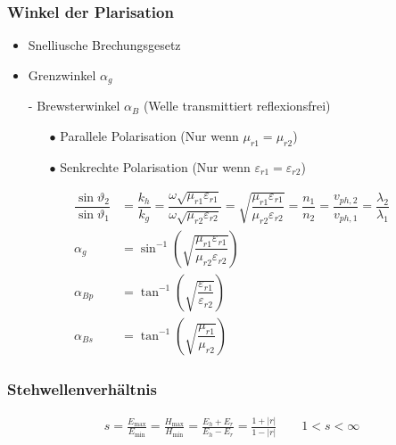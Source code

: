 \subsubsection{Winkel der Plarisation}
\begin{itemize}
    \item Snelliusche Brechungsgesetz
    \item Grenzwinkel $\alpha_g$
    \item[-] Brewsterwinkel $\alpha_B$ (Welle transmittiert reflexionsfrei)
    \begin{itemize}
        \item[$\bullet$] Parallele Polarisation (Nur wenn $\mu_{r1} = \mu_{r2}$)
        \item[$\bullet$] Senkrechte Polarisation (Nur wenn $\varepsilon_{r1} = \varepsilon_{r2}$)
    \end{itemize}
\end{itemize}

\begin{align*}
    \dfrac{\sin \vartheta_{2}}{\sin \vartheta_{1}} &= \dfrac{k_{h}}{k_{g}} = \dfrac{\omega \sqrt{\mu_{r 1} \varepsilon_{r 1}}}{\omega \sqrt{\mu_{r 2} \varepsilon_{r 2}}} = \sqrt{\dfrac{\mu_{r 1} \varepsilon_{r 1}}{\mu_{r 2} \varepsilon_{r 2}}} = \dfrac{n_{1}}{n_{2}} = \dfrac{v_{p h, 2}}{v_{p h, 1}} = \dfrac{\lambda_{2}}{\lambda_{1}}\\
    \alpha_g &= \sin^{-1} \left( \sqrt{ \dfrac{\mu_{r1} \varepsilon_{r1}}{\mu_{r2} \varepsilon_{r2}}} \right)\\
    \alpha_{Bp} &= \tan^{-1} \left( \sqrt{ \dfrac{\varepsilon_{r1}}{\varepsilon_{r2}}} \right)\\
    \alpha_{Bs} &= \tan^{-1} \left( \sqrt{ \dfrac{\mu_{r1}}{\mu_{r2}}} \right)
\end{align*}

\subsubsection{Stehwellenverhältnis}
\begin{align*}
    s = \frac{E_{\max }}{E_{\min }}=\frac{H_{\max }}{H_{\min }}=\frac{E_{h}+E_{r}}{E_{h}-E_{r}} = \frac{1+|r|}{1-|r|} \qquad 1<s<\infty
\end{align*}
